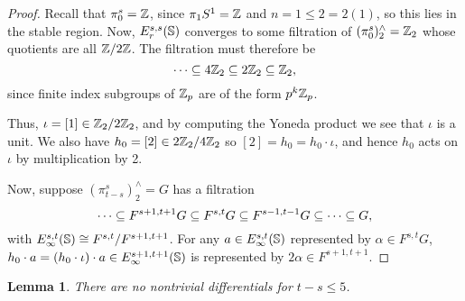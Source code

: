 \documentclass[11pt, titlepage]{article} %
\def\bb{\ensuremath\mathbb}
\def\subq{\ensuremath\subseteq}
\def\inte{\ensuremath\mathbb{Z}}
\numberwithin{equation}{subsection}
\theoremstyle{plain}
\newtheorem{lemma}[theorem]{Lemma}
\theoremstyle{definition}
\begin{document}
\begin{proof}
Recall that \(\pi_0^s=\inte\), since \(\pi_1S^1=\inte\) and \(n=1\leq 2=2(1)\), so this lies in the stable region. Now, \(E^{s,s}_r(\bb{S})\) converges to some filtration of \((\pi_0^s)^\wedge_2=\inte_2\) whose quotients are all \(\inte/2\inte\). The filtration must therefore be 
\[\cdots\subq 4\inte_2 \subq 2\inte_2 \subq \inte_2,\]
since finite index subgroups of \(\inte_p\) are of the form \(p^k\inte_p\). %

Thus, \(\iota=[1]\in \inte_2/2\inte_2\), and by computing the Yoneda product we see that \(\iota\) is a unit. We also have \(h_0=[2]\in 2\inte_2/4\inte_2\) so \([2]=h_0=h_0\cdot \iota\), and hence \(h_0\) acts on \(\iota\) by multiplication by 2. 

Now, suppose \((\pi_{t-s}^s)^\wedge_2=G\) has a filtration
\[\cdots \subq F^{s+1, t+1}G\subq F^{s,t}G \subq F^{s-1,t-1}G\subq \cdots \subq G,\]
with \(E_\infty^{s,t}(\bb{S})\cong F^{s,t}/F^{s+1,t+1}\). For any \(a \in E^{s,t}_\infty(\bb{S})\) represented by \(\alpha\in F^{s,t}G\), \(h_0\cdot a = (h_0 \cdot \iota)\cdot a \in E_\infty^{s+1,t+1}(\bb{S})\) is represented by \(2\alpha \in F^{s+1,t+1}\). 
\end{proof}



\begin{lemma}\label{2504241225}
There are no nontrivial differentials for \(t-s\leq 5\). 
\end{lemma}
\end{document}
